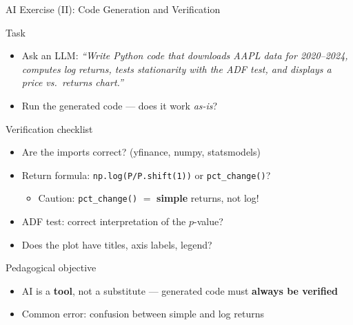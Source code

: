 \documentclass[9pt, aspectratio=169, t]{beamer}
\begin{document}
\begin{frame}[fragile, shrink=3]{AI Exercise (II): Code Generation and Verification}
\begin{block}{Task}
\begin{itemize}\setlength{\itemsep}{0pt}
    \item Ask an LLM: \textit{``Write Python code that downloads AAPL data for 2020--2024, computes log returns, tests stationarity with the ADF test, and displays a price vs.\ returns chart.''}
    \item Run the generated code --- does it work \textit{as-is}?
\end{itemize}
\end{block}
\vspace{0.1cm}
\begin{alertblock}{Verification checklist}
\begin{itemize}\setlength{\itemsep}{0pt}
    \item Are the imports correct? (yfinance, numpy, statsmodels)
    \item Return formula: \texttt{np.log(P/P.shift(1))} or \texttt{pct\_change()}?
    \begin{itemize}\setlength{\itemsep}{0pt}
        \item Caution: \texttt{pct\_change()} $=$ \textbf{simple} returns, not log!
    \end{itemize}
    \item ADF test: correct interpretation of the $p$-value?
    \item Does the plot have titles, axis labels, legend?
\end{itemize}
\end{alertblock}
\vspace{0.1cm}
\begin{exampleblock}{Pedagogical objective}
\begin{itemize}\setlength{\itemsep}{0pt}
    \item AI is a \textbf{tool}, not a substitute --- generated code must \textbf{always be verified}
    \item Common error: confusion between simple and log returns
\end{itemize}
\end{exampleblock}
\end{frame}
\end{document}
